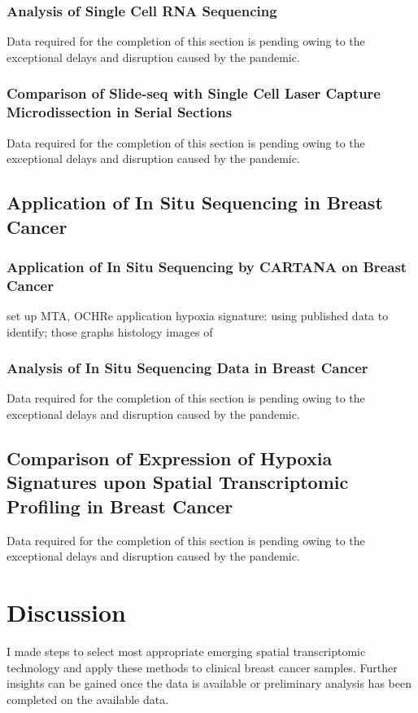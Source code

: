 \subsubsection{Analysis of Single Cell RNA Sequencing}
Data required for the completion of this section is pending owing to the exceptional delays and disruption caused by the pandemic. 

\subsubsection{Comparison of Slide-seq with Single Cell Laser Capture Microdissection in Serial Sections}
Data required for the completion of this section is pending owing to the exceptional delays and disruption caused by the pandemic. 

\subsection{Application of In Situ Sequencing in Breast Cancer}
\subsubsection{Application of In Situ Sequencing by CARTANA on Breast Cancer}
set up MTA, OCHRe application
hypoxia signature: using published data to identify; those graphs
histology images of 

\subsubsection{Analysis of In Situ Sequencing Data in Breast Cancer}
Data required for the completion of this section is pending owing to the exceptional delays and disruption caused by the pandemic. 

\subsection{Comparison of Expression of Hypoxia Signatures upon Spatial Transcriptomic Profiling in Breast Cancer}
Data required for the completion of this section is pending owing to the exceptional delays and disruption caused by the pandemic. 

\section{Discussion}
I made steps to select most appropriate emerging spatial transcriptomic technology and apply these methods to clinical breast cancer samples. 
Further insights can be gained once the data is available or preliminary analysis has been completed on the available data.


